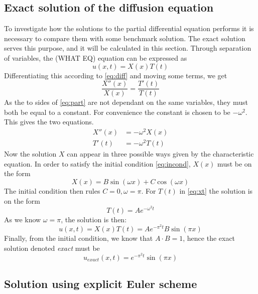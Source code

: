 \documentclass[a4paper,11pt,twocolumn]{article}
\begin{document}
\subsection{Exact solution of the diffusion equation}
To investigate how the solutions to the partial differential equation performs it is necessary to compare them with some benchmark solution. The exact solution serves this purpose, and it will be calculated in this section. 
Through separation of variables, the (WHAT EQ) equation can be expressed as
\begin{equation}
u(x,t) = X(x)T(t)
\label{eq:separated}
\end{equation}
Differentiating this according to \eqref{eq:diff} and moving some terms, we get
\begin{equation}
\frac{X''(x)}{X(x)} = \frac{T'(t)}{T(t)}
\label{eq:part}
\end{equation}
As the to sides of \eqref{eq:part} are not dependant on the same variables, they must both be equal to a constant. For convenience the constant is chosen to be $-\omega ^2$. This gives the two equations.
\begin{equation}
\begin{split}
X''(x) &= -\omega ^2 X(x) \\
T'(t) &= -\omega^2 T(t)
\end{split}
\label{eq:xt}
\end{equation}
Now the solution $X$ can appear in three possible ways given by the characteristic equation. In order to satisfy the initial condition \eqref{eq:incond}, $X(x)$ must be on the form
\begin{equation*}
X(x) = B\sin(\omega x) + C\cos(\omega x)
\end{equation*}
The initial condition then rules $C=0, \omega = \pi$. For $T(t)$ in \eqref{eq:xt} the solution is on the form
\begin{equation*}
T(t) = Ae^{-\omega^2t}
\end{equation*}
As we know $\omega =\pi$, the solution is then:
\begin{equation*}
u(x,t) = X(x)T(t) = Ae^{-\pi^2 t}B\sin(\pi x)
\end{equation*}
Finally, from the initial condition, we know that $A\cdot B = 1$, hence the exact solution denoted \textit{exact} must be
\begin{equation}
u_{exact}(x,t) = e^{-\pi^2 t}\sin(\pi x)
\label{eq:exact}
\end{equation}

\subsection{Solution using explicit Euler scheme}
\end{document}
